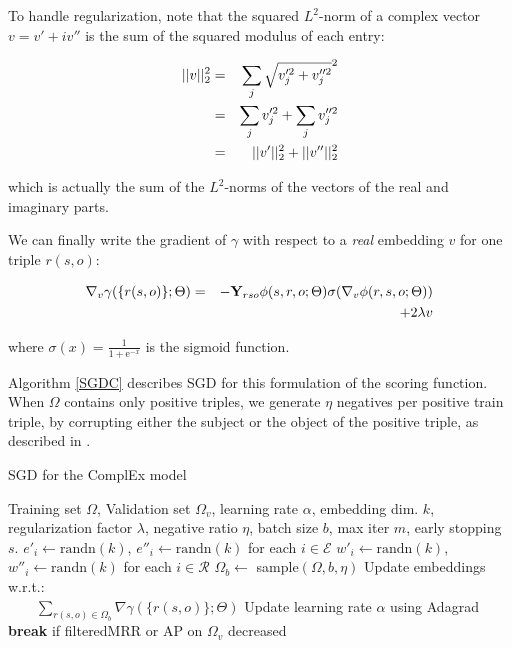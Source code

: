 \documentclass{article}
\newcommand{\grad}{\nabla}
\newcommand{\randn}{\mathrm{randn}}
\newcommand{\ObsTensor}{\mathbf{Y}}
\begin{document}
To handle regularization, note that the squared $L^2$-norm of a complex vector $v=v'+iv''$
is the sum of the squared modulus of each entry:

\begin{eqnarray}
||v||^2_2 &=& \sum_j \sqrt{v_j^{\prime2} + v_j^{\prime\prime2}}^2\notag\\
&=& \sum_j v_j^{\prime2} + \sum_j  v_j^{\prime\prime2}\notag\\
&=& ||v'||^2_2 +  ||v''||^2_2\notag
\end{eqnarray}

which is actually the sum of the $L^2$-norms of the vectors of the real and imaginary parts.

We can finally write the gradient of $\gamma$ with respect to a \emph{real} embedding $v$ for
one triple $r(s,o)$:


\begin{eqnarray}
    \grad_v \gamma(\{r(s,o)\};\Theta) &=& -\ObsTensor_{rso}\phi(s,r,o;\Theta) \sigma(\grad_v \phi(r,s,o;\Theta))\notag\\
    &&+ 2\lambda v\notag
\end{eqnarray}

where $\sigma(x) = \frac{1}{1+\mathrm{e}^{-x}}$ is the sigmoid function.

Algorithm \ref{SGDC} describes SGD for this formulation of the
scoring function.
When $\Omega$ contains only positive triples,
we generate $\eta$ negatives per positive train triple, by corrupting
either the subject or the object of the positive triple, as 
described in \citet{bordes2013translating}.


\begin{algorithm}[t]
\caption{SGD for the ComplEx model}
\label{SGDC}
\begin{algorithmic}
\INPUT Training set $\Omega$, Validation set $\Omega_v$, learning rate $\alpha$, embedding dim. $k$, regularization factor $\lambda$, negative ratio $\eta$, batch size $b$, max iter $m$, early stopping $s$.
\STATE $e'_i \gets \randn(k)$, $e''_i \gets \randn(k)$ for each $i \in \mathcal{E}$
\STATE $w'_i \gets \randn(k)$, $w''_i \gets \randn(k)$ for each $i \in \mathcal{R}$
        \STATE $\Omega_b \gets$ sample$(\Omega,b,\eta)$
        \STATE Update embeddings w.r.t.:\\
        $\quad\quad\sum_{r(s,o) \in \Omega_b} \grad \gamma(\{r(s,o)\};\Theta)$
        \STATE Update learning rate $\alpha$ using Adagrad
    \ENDFOR
        \STATE \textbf{break} if filteredMRR or AP on $\Omega_v$ decreased
    \ENDIF
\ENDFOR
\end{algorithmic}
\end{algorithm}
\end{document}
